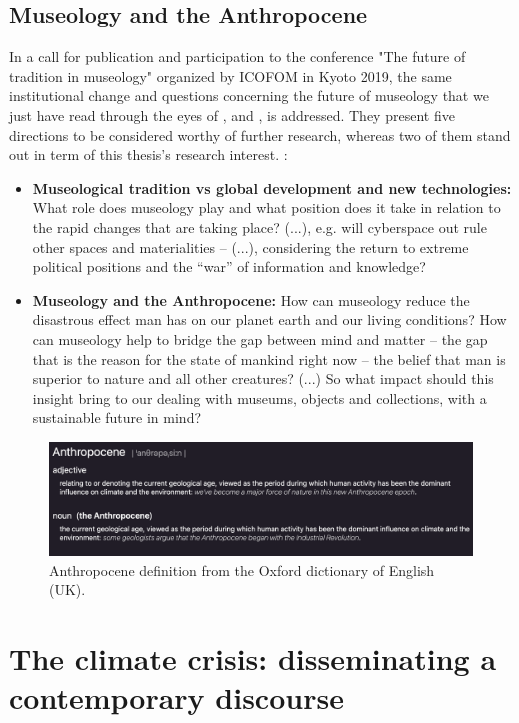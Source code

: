\subsection{Museology and the Anthropocene}
In a call for publication and participation to the conference "The future of tradition in museology" organized by ICOFOM in Kyoto 2019, the same institutional change and questions concerning the future of museology that we just have read through the eyes of \autocite{ross_interpreting_2015}, \autocite{vergo_museology_1989} and \autocite{vermeeren_museum_2018}, is addressed. They present five directions to be considered worthy of further research, whereas two of them stand out in term of this thesis's research interest. \autocite[p. 4]{icofom_kyoto_2019}:
\begin{itemize}
    \item \textbf{Museological tradition vs global development and new technologies:} What role does museology play and what position does it take in relation to the rapid changes that are taking place? (...), e.g. will cyberspace out rule other spaces and materialities – (...), considering the return to extreme political positions and the “war” of information and knowledge?
    \item \textbf{Museology and the Anthropocene:} How can museology reduce the disastrous effect man has on our planet earth and our living conditions? How can museology help to bridge the gap between mind and matter – the gap that is the reason for the state of mankind right now – the belief that man is superior to nature and all other creatures? (...) So what impact should this insight bring to our dealing with museums, objects and collections, with a sustainable future in mind?
\end{itemize}

\begin{figure}[H]
\includegraphics[width=12.5cm]{pictures/background/anthropocene.png}
\caption{Anthropocene definition from the Oxford dictionary of English (UK).}
\centering
\end{figure}


\section{The climate crisis: disseminating a contemporary discourse}

